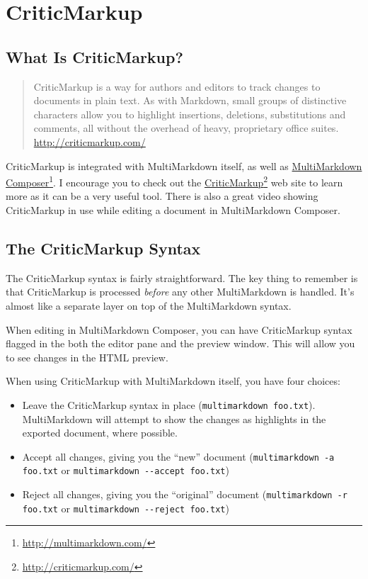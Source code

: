 \section{CriticMarkup }
\label{criticmarkup}

\subsection{What Is CriticMarkup? }
\label{whatiscriticmarkup}

\begin{quote}
CriticMarkup is a way for authors and editors to track changes to documents in plain text. As with Markdown, small groups of distinctive characters allow you to highlight insertions, deletions, substitutions and comments, all without the overhead of heavy, proprietary office suites. \href{http://criticmarkup.com/}{http:\slash \slash criticmarkup.com\slash }
\end{quote}

CriticMarkup is integrated with MultiMarkdown itself, as well as \href{http://multimarkdown.com/}{MultiMarkdown Composer}\footnote{\href{http://multimarkdown.com/}{http:\slash \slash multimarkdown.com\slash }}. I encourage you to check out the \href{http://criticmarkup.com/}{CriticMarkup}\footnote{\href{http://criticmarkup.com/}{http:\slash \slash criticmarkup.com\slash }} web site to learn more as it can be a very useful tool. There is also a great video showing CriticMarkup in use while editing a document in MultiMarkdown Composer.

\subsection{The CriticMarkup Syntax }
\label{thecriticmarkupsyntax}

The CriticMarkup syntax is fairly straightforward. The key thing to remember is that CriticMarkup is processed \emph{before} any other MultiMarkdown is handled. It's almost like a separate layer on top of the MultiMarkdown syntax.

When editing in MultiMarkdown Composer, you can have CriticMarkup syntax flagged in the both the editor pane and the preview window. This will allow you to see changes in the HTML preview.

When using CriticMarkup with MultiMarkdown itself, you have four choices:

\begin{itemize}
\item Leave the CriticMarkup syntax in place (\texttt{multimarkdown foo.txt}). MultiMarkdown will attempt to show the changes as highlights in the exported document, where possible.

\item Accept all changes, giving you the ``new'' document (\texttt{multimarkdown -a foo.txt} or \texttt{multimarkdown -{}-accept foo.txt})

\item Reject all changes, giving you the ``original'' document (\texttt{multimarkdown -r foo.txt} or \texttt{multimarkdown -{}-reject foo.txt})

\end{itemize}

